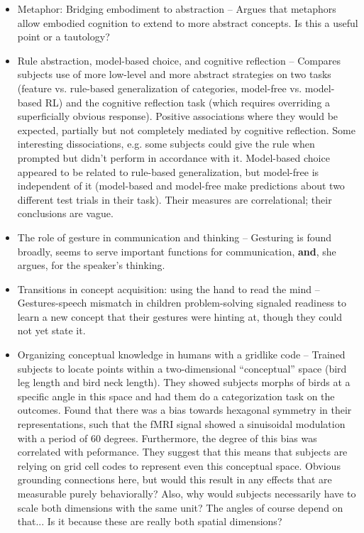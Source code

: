 \documentclass[11pt]{article}
\begin{document}
\begin{itemize}
\item Metaphor: Bridging embodiment to abstraction -- Argues that metaphors allow embodied cognition to extend to more abstract concepts. Is this a useful point or a tautology? 
\item Rule abstraction, model-based choice, and cognitive reflection -- Compares subjects use of more low-level and more abstract strategies on two tasks (feature vs. rule-based generalization of categories, model-free vs. model-based RL) and the cognitive reflection task (which requires overriding a superficially obvious response). Positive associations where they would be expected, partially but not completely mediated by cognitive reflection. Some interesting dissociations, e.g. some subjects could give the rule when prompted but didn't perform in accordance with it. Model-based choice appeared to be related to rule-based generalization, but model-free is independent of it (model-based and model-free make predictions about two different test trials in their task). Their measures are correlational; their conclusions are vague. 
\item The role of gesture in communication and thinking -- Gesturing is found broadly, seems to serve important functions for communication, \textbf{and}, she argues, for the speaker's thinking. \citet{Goldin-Meadow1999}
\item Transitions in concept acquisition: using the hand to read the mind -- Gestures-speech mismatch in children problem-solving signaled readiness to learn a new concept that their gestures were hinting at, though they could not yet state it.
\item Organizing conceptual knowledge in humans with a gridlike code -- Trained subjects to locate points within a two-dimensional ``conceptual'' space (bird leg length and bird neck length). They showed subjects morphs of birds at a specific angle in this space and had them do a categorization task on the outcomes. Found that there was a bias towards hexagonal symmetry in their representations, such that the fMRI signal showed a sinuisoidal modulation with a period of 60 degrees. Furthermore, the degree of this bias was correlated with peformance. They suggest that this means that subjects are relying on grid cell codes to represent even this conceptual space. Obvious grounding connections here, but would this result in any effects that are measurable purely behaviorally? Also, why would subjects necessarily have to scale both dimensions with the same unit? The angles of course depend on that... Is it because these are really both spatial dimensions? \citep{Constantinescu2016}\par

\end{itemize}
\end{document}
